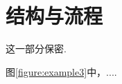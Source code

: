 \section{结构与流程}

这一部分保密. 

图\ref{figure:example3}中，....

\begin{figure}[htb!]
\begin{center}
\small
%
\end{center}
\end{figure}
